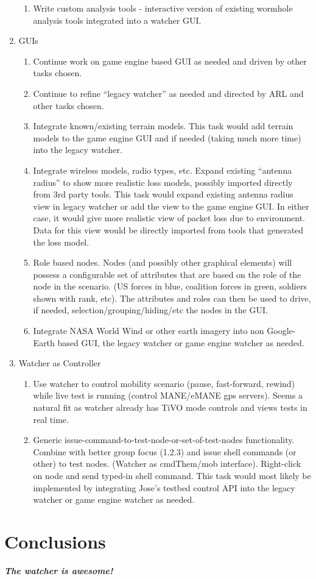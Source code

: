\documentclass{report}
\begin{document}
\begin{enumerate}
\begin{enumerate}
        \item Write custom analysis tools - interactive version of existing wormhole analysis tools integrated into a watcher GUI.
\end{enumerate}
\item GUIs 
\begin{enumerate}
    \item Continue work on game engine based GUI as needed and driven by other tasks chosen. 
    \item Continue to refine “legacy watcher” as needed and directed by ARL and other tasks chosen.
    \item Integrate known/existing terrain models. This task would add terrain models to the game engine GUI and if needed (taking much more time) into the legacy watcher.
    \item Integrate wireless models, radio types, etc. Expand existing “antenna radius” to show more realistic loss models, possibly imported directly from 3rd party tools. This task would expand existing antenna radius view in legacy watcher or add the view to the game engine GUI. In either case, it would give more realistic view of packet loss due to environment. Data for this view would be directly imported from tools that generated the loss model. 
    \item Role based nodes. Nodes (and possibly other graphical elements) will possess a configurable set of attributes that are based on the role of the node in the scenario. (US forces in blue, coalition forces in green, soldiers shown with rank, etc). The attributes and roles can then be used to drive, if needed, selection/grouping/hiding/etc the nodes in the GUI.   
    \item Integrate NASA World Wind or other earth imagery into non Google-Earth based GUI, the legacy watcher or game engine watcher as needed. 
\end{enumerate}
\item Watcher as Controller 
\begin{enumerate}
    \item Use watcher to control mobility scenario (pause, fast-forward, rewind) while live test is running (control MANE/eMANE gps servers). Seems a natural fit as watcher already has TiVO mode controls and views tests in real time. 
    \item Generic issue-command-to-test-node-or-set-of-test-nodes functionality. Combine with better group focus (1.2.3) and issue shell commands (or other) to test nodes. (Watcher as cmdThem/mob interface). Right-click on node and send typed-in shell command. This task would most likely be implemented by integrating Jose's testbed control API into the legacy watcher or game engine watcher as needed. 
\end{enumerate}
\end{enumerate}

\section{Conclusions}

{\bf {\it The watcher is awesome!}}
\end{document}
